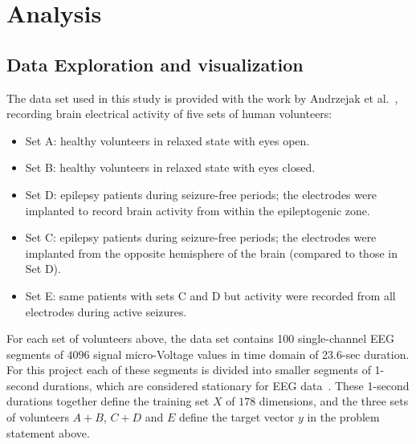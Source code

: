\documentclass[12pt]{article}
\begin{document}

\section{Analysis}

\subsection{Data Exploration and visualization}

\label{sec:data_set}
The data set used in this study is provided with the work by Andrzejak et al.~\cite{andrzejak2001indications}, recording brain electrical activity of five sets of human volunteers:
\begin{itemize}
\item Set A: healthy volunteers in relaxed state with eyes open.
\item Set B: healthy volunteers in relaxed state with eyes closed.
\item Set D: epilepsy patients during seizure-free periods; the electrodes were implanted to record brain activity from within the epileptogenic zone.
\item Set C: epilepsy patients during seizure-free periods; the electrodes were implanted from the opposite hemisphere of the brain (compared to those in Set D).
\item Set E: same patients with sets C and D but activity were recorded from all electrodes during active seizures.
\end{itemize}

For each set of volunteers above, the data set contains 100 single-channel EEG segments of $4096$ signal micro-Voltage values in time domain of 23.6-sec duration. For this project each of these segments is divided into smaller segments of 1-second durations, which are considered stationary for EEG data~\cite{nigam2004neural}. These 1-second durations together define the training set $X$ of $178$ dimensions, and the three sets of volunteers $A + B$, $C + D$ and $E$ define the target vector $y$ in the problem statement above.
\end{document}
